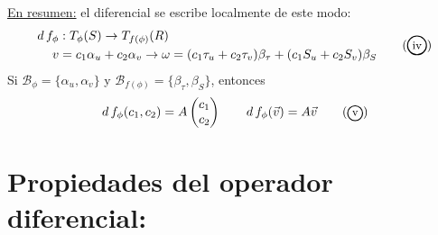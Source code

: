 \documentclass{article}
\theoremstyle{definition}
\newcommand{\tagcirculo}[1]{%
  \begin{tikzpicture}[baseline=(node.base)]
    \node[circle, draw, inner sep=2pt, minimum size=0.2cm, thick] (node) {\small #1};
  \end{tikzpicture}%
}
\begin{document}
    \underline{En resumen:} el diferencial se escribe localmente de este modo:
    \begin{equation*}
      \begin{aligned}
        d\, f_\phi &: T_\phi(S) \to T_{f(\phi)}(R) \\
        v &= c_1\alpha_u + c_2\alpha_v \to \omega = (c_1 \tau_u + c_2 \tau_v)\beta_\tau + (c_1 S_u + c_2 S_v)\beta_S
      \end{aligned} 
      \stepcounter{equation}
      \tag{\tagcirculo{iv}} 
    \end{equation*}
    Si $\mathcal{B}_\phi = \{\alpha_u, \alpha_v\}$ y $\mathcal{B}_{f(\phi)} = \{\beta_\tau, \beta_S\}$, entonces 
    \begin{equation*}
      d\, f_\phi (c_1, c_2) = A 
      \begin{pmatrix}
        c_1 \\
        c_2
      \end{pmatrix} 
      \quad\quad
      d\, f_\phi(\vec{v})= A \vec{v}
      \stepcounter{equation}
      \tag{\tagcirculo{v}}
    \end{equation*}

    \section{Propiedades del operador diferencial:}
\end{document}

